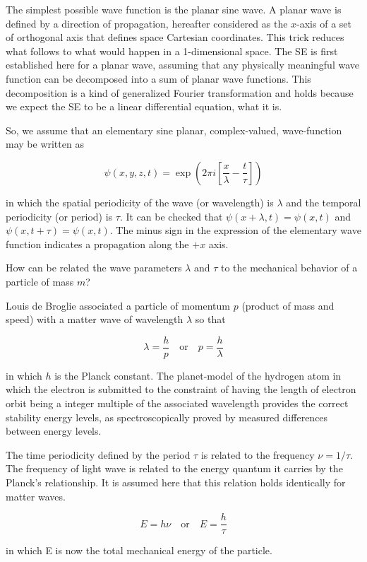 \documentclass{article}
\begin{document}
The simplest possible wave function is the planar sine wave. 
A planar wave is defined by a direction of propagation, hereafter considered as the $x$-axis 
of a set of orthogonal axis that defines space Cartesian coordinates.
This trick reduces what follows to what would happen in a 1-dimensional space.
The SE is first established here for a planar wave, assuming that any physically meaningful wave function 
can be decomposed into a sum of planar wave functions.
This decomposition is a kind of generalized Fourier transformation and holds because
we expect the SE to be a linear differential equation, what it is.

So, we assume that an elementary sine planar, complex-valued, wave-function may be written as

\[
\psi(x, y, z, t) = \exp\left( 2\pi i \left[ \frac{x}{\lambda} - \frac{t}{\tau} \right] \right)
\]

\noindent in which the spatial periodicity of the wave (or wavelength) is $\lambda$
and the temporal periodicity (or period) is $\tau$.
It can be checked that $\psi(x+\lambda, t)=\psi(x, t)$ and $\psi(x, t+\tau)=\psi(x,t)$.
The minus sign in the expression of the elementary wave function indicates a propagation along the $+x$ axis.

How can be related the wave parameters $\lambda$ and $\tau$ to the mechanical behavior of a particle of mass $m$?

Louis de Broglie associated a particle of momentum $p$ (product of mass and speed)
with a matter wave of wavelength $\lambda$ so that

\[
\lambda = \frac{h}{p} \quad \mbox{or} \quad p = \frac{h}{\lambda}
\]

\noindent in which $h$ is the Planck constant.
The planet-model of the hydrogen atom in which the electron is submitted to the constraint of
having the length of electron orbit being a integer multiple of the associated wavelength 
provides the correct stability energy levels, as spectroscopically proved by measured differences between energy levels.

The time periodicity defined by the period $\tau$ is related to the frequency $\nu = 1/\tau$. 
The frequency of light wave is related to the energy quantum it carries by the Planck's relationship.
It is assumed here that this relation holds identically for matter waves.

\[
E = h\nu \quad \mbox{or} \quad E = \frac{h}{\tau}
\]

\noindent in which E is now the total mechanical energy of the particle.
\end{document}
